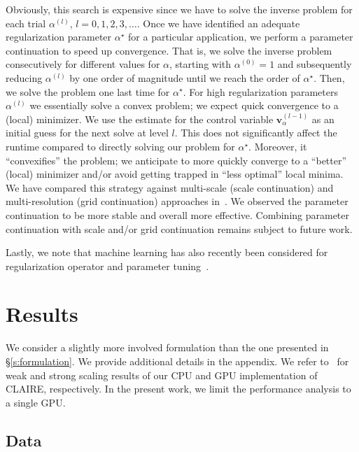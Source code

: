 \documentclass[11pt]{amsart}
\newcommand{\secref}[1]{\S\ref{#1}}
\renewcommand{\vec}[1]{\ensuremath{\boldsymbol{#1}}}
\begin{document}
Obviously, this search is expensive since we have to solve the inverse problem for each trial $\alpha^{(l)}$, $l = 0,1,2,3, \ldots$. Once we have identified an adequate regularization parameter $\alpha^\star$ for a particular application, we perform a parameter continuation to speed up convergence. That is, we solve the inverse problem consecutively for different values for $\alpha$, starting with $\alpha^{(0)} = 1$ and subsequently reducing $\alpha^{(l)}$ by one order of magnitude until we reach the order of $\alpha^\star$. Then, we solve the problem one last time for $\alpha^\star$. For high regularization parameters $\alpha^{(l)}$ we essentially solve a convex problem; we expect quick convergence to a (local) minimizer. We use the estimate for the control variable $\vec{v}_{\alpha}^{(l-1)}$ as an initial guess for the next solve at level $l$. This does not significantly affect the runtime compared to directly solving our problem for $\alpha^\star$. Moreover, it ``convexifies'' the problem; we anticipate to more quickly converge to a ``better'' (local) minimizer and/or avoid getting trapped in ``less optimal'' local minima. We have compared this strategy against multi-scale (scale continuation) and multi-resolution (grid continuation) approaches in~\cite{Mang:2019a}. We observed the parameter continuation to be more stable and overall more effective. Combining parameter continuation with scale and/or grid continuation remains subject to future work.

Lastly, we note that machine learning has also recently been considered for regularization operator and parameter tuning~\cite{Wang:2020a,Al:2021a}.




\section{Results}\label{s:results}

We consider a slightly more involved formulation than the one presented in \secref{s:formulation}. We provide additional details in the appendix. We refer to~\cite{Mang:2016a,Gholami:2017a,Mang:2019a,Brunn:2020a} for weak and strong scaling results of our CPU and GPU implementation of CLAIRE, respectively. In the present work, we limit the performance analysis to a single GPU.




\subsection{Data}
\end{document}
